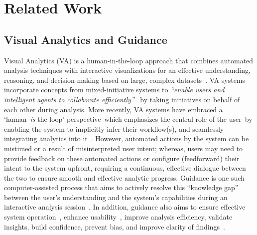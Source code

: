 \section{Related Work}
\label{section:relatedwork}

\subsection{Visual Analytics and Guidance}
Visual Analytics (VA) is a human-in-the-loop approach that combines automated analysis techniques with interactive visualizations for an effective understanding, reasoning, and decision-making based on large, complex datasets~\cite{keim2008visual}.
VA systems incorporate concepts from mixed-initiative systems to \emph{``enable users and intelligent agents to collaborate efficiently''}~\cite{horvitz1999principles} by taking initiatives on behalf of each other during analysis. More recently, VA systems have embraced a `human~\emph{is} the loop' perspective--which emphasizes the central role of the user--by enabling the system to implicitly infer their workflow(s), and seamlessly integrating analytics into it~\cite{endert2012semanticinteraction}.
However, automated actions by the system can be mistimed or a result of misinterpreted user intent; whereas, users may need to provide feedback on these automated actions or configure (feedforward) their intent to the system upfront, requiring a continuous, effective dialogue between the two to ensure smooth and effective analytic progress.
Guidance is one such computer-assisted process that aims to actively resolve this ``knowledge gap'' between the user's understanding and the system's capabilities during an interactive analysis session~\cite{ceneda2016characterizing, ceneda2017amending, collins2018guidance}.
In addition, guidance also aims to ensure effective system operation~\cite{smith1986guidelines}, enhance usability~\cite{dix2003human}, improve analysis efficiency, validate insights, build confidence, prevent bias, and improve clarity of findings~\cite{collins2018guidance}.

